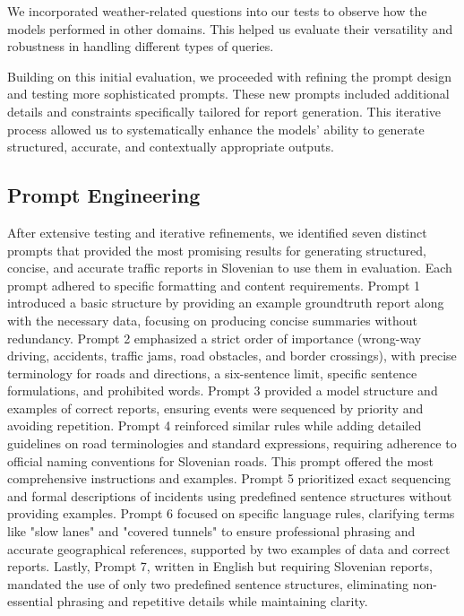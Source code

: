 \documentclass[fleqn,moreauthors,10pt]{ds_report}
\begin{document}
We incorporated weather-related questions into our tests to observe how the models performed in other domains. This helped us evaluate their versatility and robustness in handling different types of queries.

Building on this initial evaluation, we proceeded with refining the prompt design and testing more sophisticated prompts. These new prompts included additional details and constraints specifically tailored for report generation. This iterative process allowed us to systematically enhance the models' ability to generate structured, accurate, and contextually appropriate outputs.

\subsection*{Prompt Engineering}

After extensive testing and iterative refinements, we identified seven distinct prompts that provided the most promising results for generating structured, concise, and accurate traffic reports in Slovenian to use them in evaluation. Each prompt adhered to specific formatting and content requirements. Prompt 1 introduced a basic structure by providing an example groundtruth report along with the necessary data, focusing on producing concise summaries without redundancy. Prompt 2 emphasized a strict order of importance (wrong-way driving, accidents, traffic jams, road obstacles, and border crossings), with precise terminology for roads and directions, a six-sentence limit, specific sentence formulations, and prohibited words. Prompt 3 provided a model structure and examples of correct reports, ensuring events were sequenced by priority and avoiding repetition. Prompt 4 reinforced similar rules while adding detailed guidelines on road terminologies and standard expressions, requiring adherence to official naming conventions for Slovenian roads. This prompt offered the most comprehensive instructions and examples. Prompt 5 prioritized exact sequencing and formal descriptions of incidents using predefined sentence structures without providing examples. Prompt 6 focused on specific language rules, clarifying terms like "slow lanes" and "covered tunnels" to ensure professional phrasing and accurate geographical references, supported by two examples of data and correct reports. Lastly, Prompt 7, written in English but requiring Slovenian reports, mandated the use of only two predefined sentence structures, eliminating non-essential phrasing and repetitive details while maintaining clarity.
\end{document}
